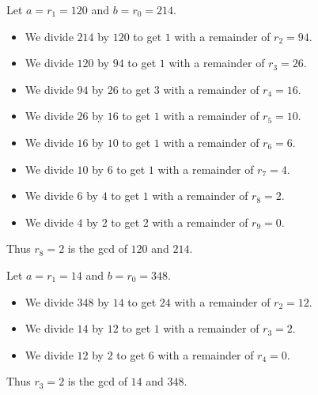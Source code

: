 \documentclass[11pt,dvipsnames]{book}
\numberwithin{figure}{section} %
\numberwithin{table}{section} %
\begin{document}
\begin{example}
Let $a = r_1 = 120$ and $b = r_0 = 214$.
\begin{itemize}
    \item We divide $214$ by $120$ to get $1$ with a remainder of $r_2=94$.
    \item We divide $120$ by $94$ to get $1$ with a remainder of $r_3 = 26$.
    \item We divide $94$ by $26$ to get $3$ with a remainder of $r_4 = 16$.
    \item We divide $26$ by $16$ to get $1$ with a remainder of $r_5 = 10$.
    \item We divide $16$ by $10$ to get $1$ with a remainder of $r_6 = 6$.
    \item We divide $10$ by $6$ to get $1$ with a remainder of $r_7 = 4$.
    \item We divide $6$ by $4$ to get $1$ with a remainder of $r_8 = 2$.
    \item We divide $4$ by $2$ to get $2$ with a remainder of $r_9 = 0$.
\end{itemize}
Thus $r_8 = 2$ is the gcd of $120$ and $214$.
\end{example}

\begin{example}
Let $a = r_1 = 14$ and $b = r_0 = 348$.
\begin{itemize}
    \item We divide $348$ by $14$ to get $24$ with a remainder of $r_2=12$.
    \item We divide $14$ by $12$ to get $1$ with a remainder of $r_3 = 2$.
    \item We divide $12$ by $2$ to get $6$ with a remainder of $r_4 = 0$.
\end{itemize}
Thus $r_3 = 2$ is the gcd of $14$ and $348$.
\end{example}
\end{document}
